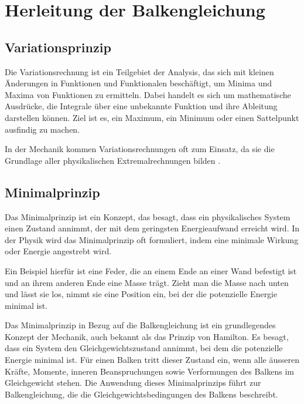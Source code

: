 %
%
%
%
\section{Herleitung der Balkengleichung
	\label{balken:section:teil2}}
\subsection{Variationsprinzip}
Die Variationsrechnung ist ein Teilgebiet der Analysis, das sich mit kleinen Änderungen in Funktionen und Funktionalen beschäftigt, um Minima und Maxima von Funktionen zu ermitteln. Dabei handelt es sich um mathematische Ausdrücke, die Integrale über eine unbekannte Funktion und ihre Ableitung darstellen können. Ziel ist es, ein Maximum, ein Minimum oder einen Sattelpunkt ausfindig zu machen.

In der Mechanik kommen Variationsrechnungen oft zum Einsatz, da sie die Grundlage aller physikalischen Extremalrechnungen bilden \cite{balken:Variationsrechnung}.

\subsection{Minimalprinzip}
Das Minimalprinzip ist ein Konzept, das besagt, dass ein physikalisches System einen Zustand annimmt, der mit dem geringsten Energieaufwand erreicht wird. In der Physik wird das Minimalprinzip oft formuliert, indem eine minimale Wirkung oder Energie angestrebt wird.

Ein Beispiel hierfür ist eine Feder, die an einem Ende an einer Wand befestigt ist und an ihrem anderen Ende eine Masse trägt. Zieht man die Masse nach unten und lässt sie los, nimmt sie eine Position ein, bei der die potenzielle Energie minimal ist.

Das Minimalprinzip in Bezug auf die Balkengleichung ist ein grundlegendes Konzept der Mechanik, auch bekannt als das Prinzip von Hamilton. Es besagt, dass ein System den Gleichgewichtszustand annimmt, bei dem die potenzielle Energie minimal ist. Für einen Balken tritt dieser Zustand ein, wenn alle äusseren Kräfte, Momente, inneren Beanspruchungen sowie Verformungen des Balkens im Gleichgewicht stehen. Die Anwendung dieses Minimalprinzips führt zur Balkengleichung, die die Gleichgewichtsbedingungen des Balkens beschreibt. 

